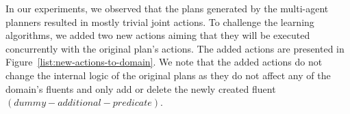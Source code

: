 \documentclass[letterpaper]{article} %
\theoremstyle{definition}
\theoremstyle{remark}
\begin{document}
In our experiments, we observed that the plans generated by the multi-agent planners resulted in mostly trivial joint actions. 
To challenge the learning algorithms, we added two new actions aiming that they will be executed concurrently with the original plan's actions. 
The added actions are presented in Figure~\ref{list:new-actions-to-domain}. We note that the added actions do not change the internal logic of the original plans as they do not affect any of the domain's fluents and only add or delete the newly created fluent $(dummy-additional-predicate)$.






\end{document}
